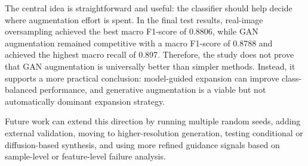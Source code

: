 \documentclass[conference]{IEEEtran}
\begin{document}
The central idea is straightforward and useful: the classifier should help decide where augmentation effort is spent. In the final test results, real-image oversampling achieved the best macro F1-score of 0.8806, while GAN augmentation remained competitive with a macro F1-score of 0.8788 and achieved the highest macro recall of 0.897. Therefore, the study does not prove that GAN augmentation is universally better than simpler methods. Instead, it supports a more practical conclusion: model-guided expansion can improve class-balanced performance, and generative augmentation is a viable but not automatically dominant expansion strategy.

Future work can extend this direction by running multiple random seeds, adding external validation, moving to higher-resolution generation, testing conditional or diffusion-based synthesis, and using more refined guidance signals based on sample-level or feature-level failure analysis.
\end{document}
